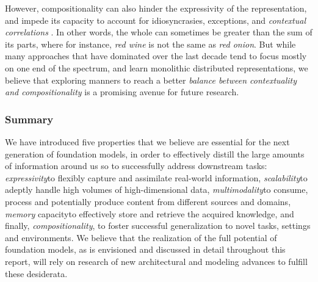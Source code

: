 However, compositionality can also hinder the expressivity of the representation, and impede its capacity to account for idiosyncrasies, exceptions, and \textit{contextual correlations} \citep{redwine}. In other words, the whole can sometimes be greater than the sum of its parts, where for instance, \textit{red wine} is not the same as \textit{red onion}. But while many approaches that have dominated over the last decade tend to focus mostly on one end of the spectrum, and learn monolithic distributed representations, we believe that exploring manners to reach a better \textit{balance between contextuality and compositionality} is a promising avenue for future research.

\subsubsection{Summary}
We have introduced five properties that we believe are essential for the next generation of foundation models, in order to effectively distill the large amounts of information around us so to successfully address downstream tasks: \textit{expressivity}\dash{}to flexibly capture and assimilate real-world information, \textit{scalability}\dash{}to adeptly handle high volumes of high-dimensional data, \textit{multimodality}\dash{}to consume, process and potentially produce content from different sources and domains, \textit{memory} capacity\dash{}to effectively store and retrieve the acquired knowledge, and finally, \textit{compositionality}, to foster successful generalization to novel tasks, settings and environments. We believe that the realization of the full potential of foundation models, as is envisioned and discussed in  detail throughout this report, will rely on research of new architectural and modeling advances to fulfill these desiderata.